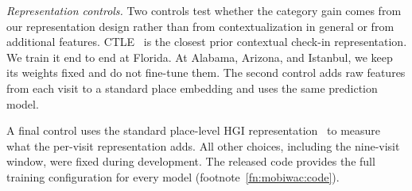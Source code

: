 \emph{Representation controls.} Two controls test whether the category gain comes from our representation design rather than from contextualization in general or from additional features. CTLE~\cite{lin2021ctle} is the closest prior contextual check-in representation. We train it end to end at Florida. At Alabama, Arizona, and Istanbul, we keep its weights fixed and do not fine-tune them. The second control adds raw features from each visit to a standard place embedding and uses the same prediction model.

A final control uses the standard place-level HGI representation~\cite{huang2023hgi} to measure what the per-visit representation adds. All other choices, including the nine-visit window, were fixed during development. The released code provides the full training configuration for every model (footnote~\ref{fn:mobiwac:code}).
